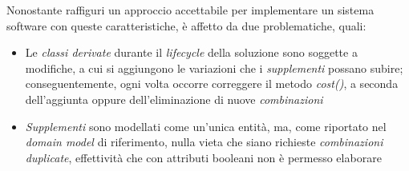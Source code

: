 \documentclass{article}
\begin{document}
Nonostante raffiguri un approccio accettabile per implementare un sistema software con queste caratteristiche, è affetto da due problematiche, quali:
\begin{itemize}[label={-}]
    \itemsep0em
    \item Le \textit{classi derivate} durante il \textit{lifecycle} della soluzione sono soggette a modifiche, a cui si aggiungono le variazioni che i \textit{supplementi} possano subire; conseguentemente, ogni volta occorre correggere il metodo \textit{cost()}, a seconda dell'aggiunta oppure dell'eliminazione di nuove \textit{combinazioni}    
    \item \textit{Supplementi} sono modellati come un'unica entità, ma, come riportato nel \textit{domain model} di riferimento, nulla vieta che siano richieste \textit{combinazioni duplicate}, effettività che con attributi booleani non è permesso elaborare
\end{itemize} 
\end{document}
